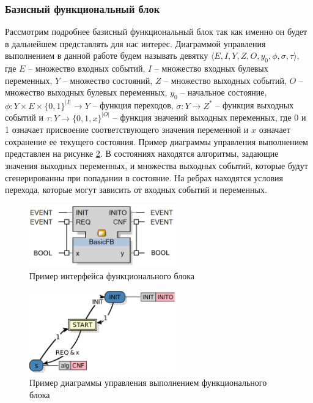 \documentclass[14pt]{article}
\begin{document}
\subsubsection{Базисный функциональный блок}

Рассмотрим подробнее базисный функциональный блок так как именно он будет в
дальнейшем представлять для нас интерес.
Диаграммой управления выполнением в данной работе будем называть девятку $\langle E, I, Y, Z, O, y_0, \phi,
\sigma, \tau \rangle$, где $E$ -- множество входных событий, $I$ -- множество
входных булевых переменных, $Y$ -- множество состояний, $Z$ -- множество
выходных событий, $O$ -- множество выходных булевых переменных, $y_0$ --
начальное состояние, $\phi : Y \times E \times \{0, 1\}^{|I|} \rightarrow
Y$ -- функция переходов, $\sigma : Y \rightarrow Z^*$ -- функция выходных
событий и $\tau : Y \rightarrow \{0, 1, x\}^{|O|}$ -- функция значений
выходных переменных, где 0 и 1 означает присвоение соответствующего значения
переменной и $x$ означает сохранение ее текущего состояния. Пример диаграммы
управления выполнением представлен на рисунке \ref{ecc-example}.
В состояниях находятся алгоритмы, задающие значения выходных переменных, и
множества выходных событий, которые будут сгенерированны при попадании
в состояние. На ребрах находятся условия перехода, которые могут зависить от
входных событий и переменных.

\begin{figure}[t]
    \centering
    \includegraphics[width=2.5in]{pic/ecc-interface-bool.png}
    \caption{Пример интерфейса функционального блока}
    \label{fb-interface-example}
\end{figure}

\begin{figure}[t]
    \centering
    \includegraphics[width=2.5in]{pic/ecc-example-bool.png}
    \caption{Пример диаграммы управления выполнением функционального блока}
    \label{ecc-example}
\end{figure}
\end{document}
